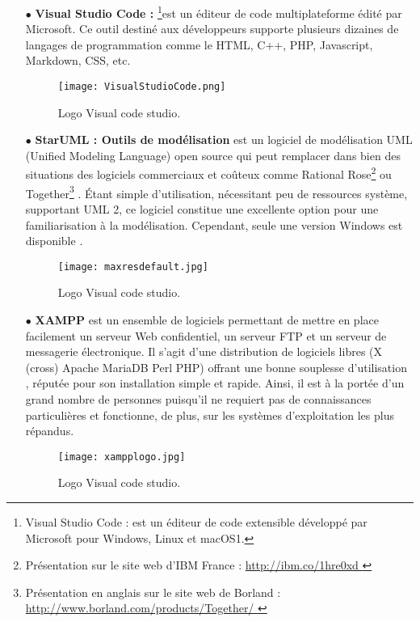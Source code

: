 \begin{itemize}
	\item[$\bullet$] \textbf{Visual Studio Code :} \footnote{Visual Studio Code : est un éditeur de code extensible développé par Microsoft pour Windows, Linux et macOS1.}est un éditeur de code multiplateforme édité par Microsoft. Ce outil destiné aux développeurs supporte plusieurs dizaines de langages de programmation comme le HTML, C++, PHP, Javascript, Markdown, CSS, etc. \cite{wiki:Visual_Studio_Code}
\begin{figure}[ht]
	\centering
	\texttt{[image: VisualStudioCode.png]}
	\caption{Logo Visual code studio.}
	\label{fig:VisualStudioCode }
\end{figure}
\FloatBarrier

\medskip

\item[$\bullet$] \textbf{StarUML : Outils de modélisation} 
est un logiciel de modélisation UML (Unified Modeling Language) open source qui peut remplacer dans bien des situations des logiciels commerciaux et coûteux comme Rational Rose\footnote{Présentation sur le site web d’IBM France :
\url{http://ibm.co/1hre0xd } } ou Together\footnote{Présentation en anglais sur le site web de Borland : \url{http://www.borland.com/products/Together/ }}
. Étant simple d’utilisation, nécessitant peu de
ressources système, supportant UML 2, ce logiciel constitue une excellente option pour une familiarisation à la modélisation. Cependant, seule une version Windows est disponible . \cite{wiki:StarUML} 
	\begin{figure}[ht]
		\centering
		\texttt{[image: maxresdefault.jpg]}
		\caption{Logo Visual code studio.}
		\label{fig:VisualStudioCod }
	\end{figure}
	\FloatBarrier
    \medskip

   \item[$\bullet$] \textbf{ XAMPP} est un ensemble de logiciels permettant de mettre
    en place facilement un serveur Web
    confidentiel, un serveur FTP et un serveur de messagerie
    électronique. Il s’agit d’une distribution de logiciels libres (X
    (cross) Apache MariaDB Perl PHP) offrant une bonne
    souplesse d'utilisation , réputée pour son installation
    simple et rapide. Ainsi, il est à la portée d’un grand nombre de
    personnes puisqu'il ne requiert pas de connaissances
    particulières et fonctionne, de plus, sur les systèmes
    d'exploitation les plus répandus.
 \cite{wiki:XAMPP} 
    \begin{figure}[ht]
    	\centering
    	\texttt{[image: xampplogo.jpg]}
    	\caption{Logo Visual code studio.}
    	\label{fig:xampp logo}
    \end{figure}
    \FloatBarrier
    

\end{itemize}
